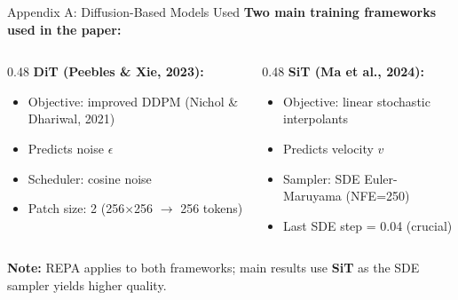 \documentclass[aspectratio=169, 10pt]{beamer}
\begin{document}
\begin{frame}{Appendix A: Diffusion-Based Models Used}
\small
\textbf{Two main training frameworks used in the paper:}

\vspace{0.5em}
\begin{columns}[T]
\begin{column}{0.48\textwidth}
\textbf{DiT (Peebles \& Xie, 2023):}
\begin{itemize}\setlength{\itemsep}{2pt}
  \item Objective: improved DDPM (Nichol \& Dhariwal, 2021)
  \item Predicts noise $\epsilon$
  \item Scheduler: cosine noise
  \item Patch size: 2 (256$\times$256 $\to$ 256 tokens)
\end{itemize}
\end{column}
\begin{column}{0.48\textwidth}
\textbf{SiT (Ma et al., 2024):}
\begin{itemize}\setlength{\itemsep}{2pt}
  \item Objective: linear stochastic interpolants
  \item Predicts velocity $v$
  \item Sampler: SDE Euler-Maruyama (NFE=250)
  \item Last SDE step = 0.04 (crucial)
\end{itemize}
\end{column}
\end{columns}

\vspace{0.5em}
\textbf{Note:} REPA applies to both frameworks; main results use \textbf{SiT} as the SDE sampler yields higher quality.
\end{frame}
\end{document}
